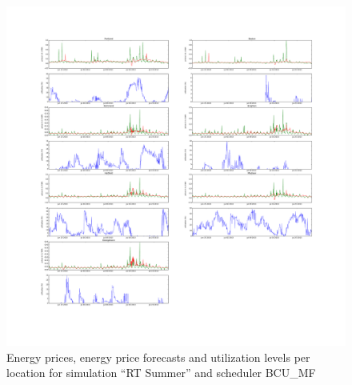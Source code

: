 \begin{figure}[htbp]
	\centering
	\vspace*{-0.6in}
	\hspace*{-1.9in}
		\includegraphics[width=1.60\textwidth]{figures/appendix_simulation_results/RT_Summer_scenario_6.pdf}
	\vspace*{-1.0in}
	\caption{Energy prices, energy price forecasts and utilization levels per location for simulation ``RT Summer'' and scheduler BCU\_MF}
	\label{fig:app_RT_Summer_scenario_6}
\end{figure}

